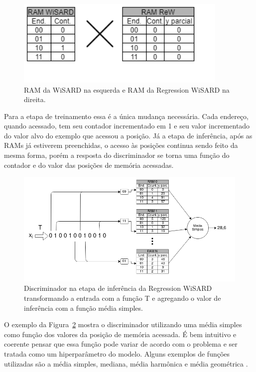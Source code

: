     \begin{figure}[!ht] \label{fig:ramxram}
    \centering
    \includegraphics[width=4.0in]{img/ramxram.png}
    \caption{RAM da WiSARD na esquerda e RAM da Regression WiSARD na direita.}
    \end{figure}
    
    Para a etapa de treinamento essa é a única mudança necessária. Cada endereço, quando acessado, tem seu contador incrementado em 1 e seu valor incrementado do valor alvo do exemplo que acessou a posição. Já a etapa de inferência, após as RAMs já estiverem preenchidas, o acesso às posições continua sendo feito da mesma forma, porém a resposta do discriminador se torna uma função do contador e do valor das posições de memória acessadas.

    \begin{figure}[!ht] \label{fig:rew_discr}
    \centering
    \includegraphics[width=6.0in]{img/rew_regression.png}
    \caption{Discriminador na etapa de inferência da Regression WiSARD transformando a entrada com a função T e agregando o valor de inferência com a função média simples.}
    \end{figure}

    O exemplo da Figura~\ref{fig:rew_discr} mostra o discriminador utilizando uma média simples como função dos valores da posição de memória acessada. É bem intuitivo e coerente pensar que essa função pode variar de acordo com o problema e ser tratada como um hiperparâmetro do modelo. Alguns exemplos de funções utilizadas são a média simples, mediana, média harmônica e média geométrica \cite{rew}.
    
